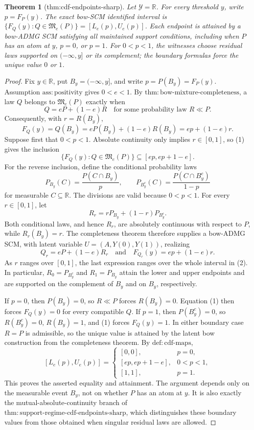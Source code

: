 \documentclass{article}
\newtheorem{theorem}{Theorem}
\begin{document}
\begin{theorem}[thm:cdf-endpoints-sharp]\label{thm:cdf-endpoints-sharp}
Let \(\mathcal Y=\mathbb R\). For every threshold \(y\), write \(p=F_P(y)\). The exact bow-SCM identified interval is \(\{F_Q(y):Q\in\mathfrak M_e(P)\}=[L_e(p),U_e(p)]\). Each endpoint is attained by a bow-ADMG SCM satisfying all maintained support conditions, including when \(P\) has an atom at \(y\), \(p=0\), or \(p=1\). For \(0<p<1\), the witnesses choose residual laws supported on \(({-}\infty,y]\) or its complement; the boundary formulas force the unique value \(0\) or \(1\).
\end{theorem}
\begin{proof}
Fix \(y\in\mathbb R\), put \(B_y=(-\infty,y]\), and write \(p=P(B_y)=F_P(y)\).  Assumption \(\mathrm{ass:positivity}\) gives \(0<e<1\).  By \(\mathrm{thm:bow\text{-}mixture\text{-}completeness}\), a law \(Q\) belongs to \(\mathfrak M_e(P)\) exactly when
\[
 Q=eP+(1-e)R
 \quad\text{for some probability law }R\ll P.
\]
Consequently, with \(r=R(B_y)\),
\[
 F_Q(y)=Q(B_y)=eP(B_y)+(1-e)R(B_y)=ep+(1-e)r. \tag{1}
\]
Suppose first that \(0<p<1\).  Absolute continuity only implies \(r\in[0,1]\), so (1) gives the inclusion
\[
 \{F_Q(y):Q\in\mathfrak M_e(P)\}\subseteq[ep,ep+1-e]. \tag{2}
\]
For the reverse inclusion, define the conditional probability laws
\[
 P_{B_y}(C)=\frac{P(C\cap B_y)}{p},
 \qquad
 P_{B_y^c}(C)=\frac{P(C\cap B_y^c)}{1-p}
\]
for measurable \(C\subseteq\mathbb R\).  The divisions are valid because \(0<p<1\).  For every \(r\in[0,1]\), let
\[
 R_r=rP_{B_y}+(1-r)P_{B_y^c}.
\]
Both conditional laws, and hence \(R_r\), are absolutely continuous with respect to \(P\), while \(R_r(B_y)=r\).  The completeness theorem therefore supplies a bow-ADMG SCM, with latent variable \(U=(A,Y(0),Y(1))\), realizing
\[
 Q_r=eP+(1-e)R_r
 \quad\text{and}
 \quad F_{Q_r}(y)=ep+(1-e)r.
\]
As \(r\) ranges over \([0,1]\), the last expression ranges over the whole interval in (2).  In particular, \(R_0=P_{B_y^c}\) and \(R_1=P_{B_y}\) attain the lower and upper endpoints and are supported on the complement of \(B_y\) and on \(B_y\), respectively.

If \(p=0\), then \(P(B_y)=0\), so \(R\ll P\) forces \(R(B_y)=0\).  Equation (1) then forces \(F_Q(y)=0\) for every compatible \(Q\).  If \(p=1\), then \(P(B_y^c)=0\), so \(R(B_y^c)=0\), \(R(B_y)=1\), and (1) forces \(F_Q(y)=1\).  In either boundary case \(R=P\) is admissible, so the unique value is attained by the latent bow construction from the completeness theorem.  By \(\mathrm{def:cdf\text{-}maps}\),
\[
 [L_e(p),U_e(p)]
 =
 \begin{cases}
 [0,0],&p=0,\\
 [ep,ep+1-e],&0<p<1,\\
 [1,1],&p=1.
 \end{cases}
\]
This proves the asserted equality and attainment.  The argument depends only on the measurable event \(B_y\), not on whether \(P\) has an atom at \(y\).  It is also exactly the mutual-absolute-continuity branch of \(\mathrm{thm:support\text{-}regime\text{-}cdf\text{-}endpoints\text{-}sharp}\), which distinguishes these boundary values from those obtained when singular residual laws are allowed.
\end{proof}
\end{document}
